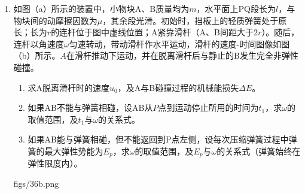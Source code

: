 \documentclass[\gkver]{gaokaozhenti}
\begin{document}
\begin{enumerate}
{\begin{enumerate}
	\item
	$R_{x}=\frac{mldB}{Mq\sin\theta}$

\end{enumerate}
}

\item
如图（a）所示的装置中，小物块A、B质量均为$m$，水平面上PQ段长为$l$，与物块间的动摩擦因数为$\mu$，其余段光滑。初始时，挡板上的轻质弹簧处于原长；长为$r$的连杆位于图中虚线位置；A紧靠滑杆（A、B间距大于2$r$）。随后，连杆以角速度$\omega$匀速转动，带动滑杆作水平运动，滑杆的速度-时间图像如图（b）所示。$A$在滑杆推动下运动，并在脱离滑杆后与静止的B发生完全非弹性碰撞。
\begin{enumerate}
	\item
	求A脱离滑杆时的速度$u_{0}$，及A与B碰撞过程的机械能损失$\Delta E$。
	\item
	如果AB不能与弹簧相碰，设AB从$P$点到运动停止所用的时间为$t_{1}$，求$\omega$的取值范围，及$t_{1}$与$\omega$的关系式。
	\item
	如果AB能与弹簧相碰，但不能返回到P点左侧，设每次压缩弹簧过程中弹簧的最大弹性势能为$E_{p}$，求$\omega$的取值范围，及$E_{p}$与$\omega$的关系式（弹簧始终在弹性限度内）。
\end{enumerate}
{figs/36b.png}
\end{enumerate}
\end{document}
